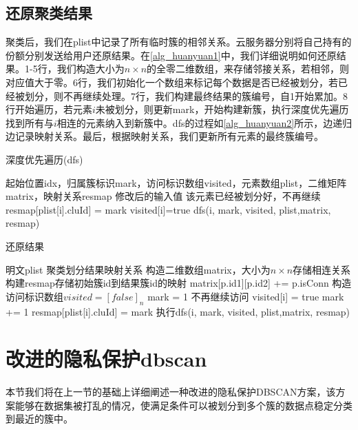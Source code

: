 \subsection{还原聚类结果}
\label{task1-huanyuan}
聚类后，我们在plist中记录了所有临时簇的相邻关系。云服务器分别将自己持有的份额分别发送给用户还原结果。在\ref{alg_huanyuan1}中，我们详细说明如何还原结果。1-5行，我们构造大小为$ n \times n $的全零二维数组，来存储邻接关系，若相邻，则对应值大于零。6行，我们初始化一个数组来标记每个数据是否已经被划分，若已经被划分，则不再继续处理。7行，我们构建最终结果的簇编号，自1开始累加。8行开始遍历，若元素$ i $未被划分，则更新mark，开始构建新簇，执行深度优先遍历找到所有与$ i $相连的元素纳入到新簇中。dfs的过程如\ref{alg_huanyuan2}所示，边递归边记录映射关系。最后，根据映射关系，我们更新所有元素的最终簇编号。

\begin{algorithm}[htbp]
	\renewcommand{\algorithmicrequire}{\textbf{输入:}}
	\renewcommand{\algorithmicensure}{\textbf{输出:}}
	\caption{深度优先遍历(dfs)}
	\label{alg_huanyuan2}
	\begin{algorithmic}[1]
		\REQUIRE 起始位置idx，归属簇标识mark，访问标识数组visited，元素数组plist，二维矩阵matrix，映射关系resmap
		\ENSURE 修改后的输入值
		\STATE 该元素已经被划分好，不再继续
		\ENDIF
		\STATE resmap[plist[i].cluId] = mark
		\STATE visited[i]=true
		\STATE dfs(i, mark, visited, plist,matrix, resmap)
		\ENDIF
		\ENDFOR
	\end{algorithmic}
\end{algorithm}

\begin{algorithm}[htbp]
	\renewcommand{\algorithmicrequire}{\textbf{输入:}}
	\renewcommand{\algorithmicensure}{\textbf{输出:}}
	\caption{还原结果}
	\label{alg_huanyuan1}
	\begin{algorithmic}[1]
		\REQUIRE 明文plist
		\ENSURE 聚类划分结果映射关系
		\STATE 构造二维数组matrix，大小为$ n\times n $存储相连关系
		\STATE 构建resmap存储初始簇id到结果簇id的映射
		\STATE matrix[p.id1][p.id2] += p.isConn
		\ENDFOR
		\STATE 构造访问标识数组$ visited=[false]_n $
		\STATE mark = 1
		\STATE 不再继续访问
		\ENDIF
		\STATE visited[i] = true
		\STATE mark += 1
		\STATE resmap[plist[i].cluId] = mark
		\STATE 执行dfs(i, mark, visited, plist,matrix, resmap)
		\ENDFOR
	\end{algorithmic}
\end{algorithm}
\section{改进的隐私保护dbscan}
\label{s4-t2}
本节我们将在上一节的基础上详细阐述一种改进的隐私保护DBSCAN方案，该方案能够在数据集被打乱的情况，使满足条件可以被划分到多个簇的数据点稳定分类到最近的簇中。

